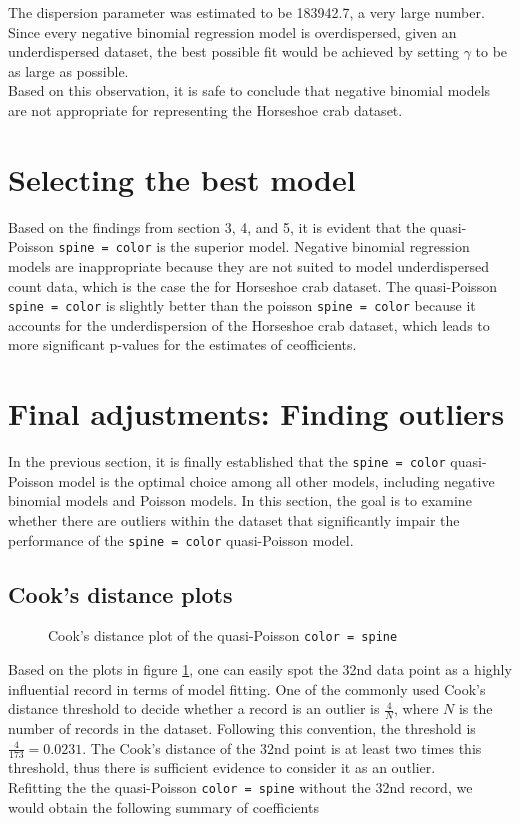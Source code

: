 \documentclass[a4paper, 12pt]{article}
\begin{document}
The dispersion parameter was estimated to be 183942.7, a very large number. Since every negative binomial regression model is overdispersed, given an underdispersed dataset, the best possible fit would be achieved by setting $\gamma$ to be as large as possible. \\
\indent Based on this observation, it is safe to conclude that negative binomial models are not appropriate for representing the Horseshoe crab dataset.

\section{Selecting the best model}
Based on the findings from section 3, 4, and 5, it is evident that the quasi-Poisson \texttt{spine = color} is the superior model. Negative binomial regression models are inappropriate because they are not suited to model underdispersed count data, which is the case the for Horseshoe crab dataset. The quasi-Poisson \texttt{spine = color} is slightly better than the poisson \texttt{spine = color} because it accounts for the underdispersion of the Horseshoe crab dataset, which leads to more significant p-values for the estimates of ceofficients.

\section{Final adjustments: Finding outliers}
In the previous section, it is finally established that the \texttt{spine = color} quasi-Poisson model is the optimal choice among all other models, including negative binomial models and Poisson models. In this section, the goal is to examine whether there are outliers within the dataset that significantly impair the performance of the \texttt{spine = color} quasi-Poisson model.


\subsection{Cook's distance plots}
\begin{figure}[H]
    \centering
    \qquad
    \caption{Cook's distance plot of the quasi-Poisson \texttt{color = spine}}
    \label{cooks-distance}
\end{figure}


Based on the plots in figure \ref{cooks-distance}, one can easily spot the 32nd data point as a highly influential record in terms of model fitting. One of the commonly used Cook's distance threshold to decide whether a record is an outlier is $\frac{4}{N}$, where $N$ is the number of records in the dataset. Following this convention, the threshold is $\frac{4}{173} = 0.0231$. The Cook's distance of the 32nd point is at least two times this threshold, thus there is sufficient evidence to consider it as an outlier. \\
\indent Refitting the the quasi-Poisson \texttt{color = spine} without the 32nd record, we would obtain the following summary of coefficients
\end{document}
